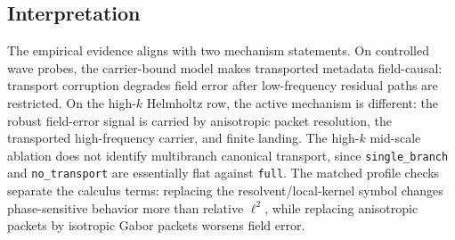 \subsection{Interpretation}

The empirical evidence aligns with two mechanism statements.  On controlled wave probes, the carrier-bound model makes transported metadata field-causal: transport corruption degrades field error after low-frequency residual paths are restricted.  On the high-$k$ Helmholtz row, the active mechanism is different: the robust field-error signal is carried by anisotropic packet resolution, the transported high-frequency carrier, and finite landing.  The high-$k$ mid-scale ablation does not identify multibranch canonical transport, since \texttt{single\_branch} and \texttt{no\_transport} are essentially flat against \texttt{full}.  The matched profile checks separate the calculus terms: replacing the resolvent/local-kernel symbol changes phase-sensitive behavior more than relative $\ell^2$, while replacing anisotropic packets by isotropic Gabor packets worsens field error.
